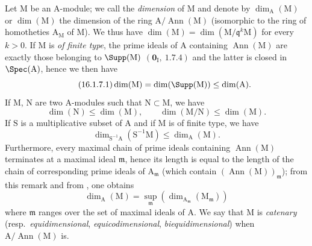\begin{env}[16.1.7]
\label{0.16.1.7}
Let $\mathrm{M}$ be an $\mathrm{A}$-module; we call the \emph{dimension} of $\mathrm{M}$ and denote by $\dim_\mathrm{A}(\mathrm{M})$ or $\dim(\mathrm{M})$ the dimension of the ring $\mathrm{A}/\operatorname{Ann}(\mathrm{M})$ (isomorphic to the ring of homotheties $\mathrm{A}_\mathrm{M}$ of $\mathrm{M}$).
We thus have $\dim(\mathrm{M})=\dim(\mathrm{M}/\mathfrak{q}^k\mathrm{M})$ for every $k>0$.
If $\mathrm{M}$ is \emph{of finite type}, the prime ideals of $\mathrm{A}$ containing $\operatorname{Ann}(\mathrm{M})$ are exactly those belonging to $\Supp(\mathrm{M})$ $(\mathbf{0}_\mathrm{I},~1.7.4)$ and the latter is closed in $\Spec(\mathrm{A})$, hence we then have
\begin{equation}
\label{0.16.1.7.1}
\tag{16.1.7.1}
  \dim(\mathrm{M})=\dim(\Supp(\mathrm{M}))\leq\dim(\mathrm{A}).
\end{equation}
If $\mathrm{M}$, $\mathrm{N}$ are two $\mathrm{A}$-modules such that $\mathrm{N}\subset\mathrm{M}$, we have
\begin{equation}
\label{0.16.1.7.2}
\tag{16.1.7.2}
  \dim(\mathrm{N})\leq\dim(\mathrm{M}),\qquad\dim(\mathrm{M}/\mathrm{N})\leq\dim(\mathrm{M}).
\end{equation}
If $\mathrm{S}$ is a multiplicative subset of $\mathrm{A}$ and if $\mathrm{M}$ is of finite type, we have
\begin{equation}
\label{0.16.1.7.3}
\tag{16.1.7.3}
  \dim_{\mathrm{S}^{-1}\mathrm{A}}(\mathrm{S}^{-1}\mathrm{M})\leq\dim_\mathrm{A}(\mathrm{M}).
\end{equation}
Furthermore, every maximal chain of prime ideals containing $\operatorname{Ann}(\mathrm{M})$ terminates at a maximal ideal $\mathfrak{m}$, hence its length is equal to the length of the chain of corresponding prime ideals of $\mathrm{A}_\mathfrak{m}$ (which contain $(\operatorname{Ann}(\mathrm{M}))_\mathfrak{m}$); from this remark and from , one obtains
\begin{equation}
\label{0.16.1.7.4}
\tag{16.1.7.4}
  \dim_\mathrm{A}(\mathrm{M})=\sup_\mathfrak{m}(\dim_{\mathrm{A}_\mathfrak{m}}(\mathrm{M}_\mathfrak{m}))
\end{equation}
where $\mathfrak{m}$ ranges over the set of maximal ideals of $\mathrm{A}$.
We say that $\mathrm{M}$ is \emph{catenary} (resp.~\emph{equidimensional}, \emph{equicodimensional}, \emph{biequidimensional}) when $\mathrm{A}/\operatorname{Ann}(\mathrm{M})$ is.
\end{env}

